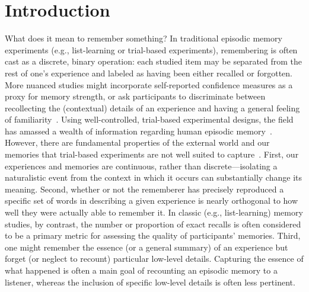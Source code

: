 \documentclass[10pt]{article}
\begin{document}
\section*{Introduction}
What does it mean to remember something? In traditional episodic memory experiments (e.g., list-learning or trial-based experiments\citep{Murd62a, Kaha96}), remembering is often cast as a discrete, binary operation: each studied item may be separated from the rest of one's experience and labeled as having been either recalled or forgotten. More nuanced studies might incorporate self-reported confidence measures as a proxy for memory strength, or ask participants to discriminate between recollecting the (contextual) details of an experience and having a general feeling of familiarity~\citep{Yone02}. Using well-controlled, trial-based experimental designs, the field has amassed a wealth of information regarding human episodic memory~\citep{Kaha12}.  However, there are fundamental properties of the external world and our memories that trial-based experiments are not well suited to capture~\citep{KoriGold94, HukEtal18}.  First, our experiences and memories are continuous, rather than discrete---isolating a naturalistic event from the context in which it occurs can substantially change its meaning.  Second, whether or not the rememberer has precisely reproduced a specific set of words in describing a given experience is nearly orthogonal to how well they were actually able to remember it.  In classic (e.g., list-learning) memory studies, by contrast, the number or proportion of exact recalls is often considered to be a primary metric for assessing the quality of participants' memories.  Third, one might remember the essence (or a general summary) of an experience but forget (or neglect to recount) particular low-level details.  Capturing the essence of what happened is often a main goal of recounting an episodic memory to a listener, whereas the inclusion of specific low-level details is often less pertinent.
\end{document}
